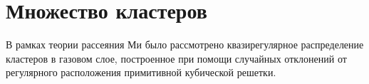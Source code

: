 \section{Множество кластеров}

В рамках теории рассеяния Ми было рассмотрено квазирегулярное распределение кластеров в газовом слое, построенное при помощи случайных отклонений от регулярного расположения примитивной кубической решетки. 







